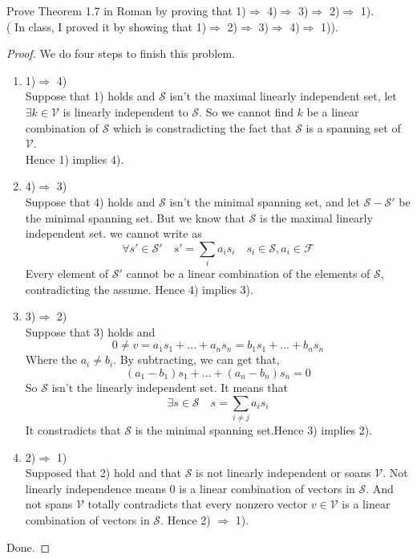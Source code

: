 \documentclass[a4paper]{article}
\begin{document}
\begin{description}
{    Prove Theorem 1.7 in Roman by proving that 1)$\Rightarrow$ 4)$\Rightarrow$  3)$\Rightarrow$  2)$\Rightarrow$  1).\\
    ( In class, I proved it by showing that 1)$\Rightarrow$  2)$\Rightarrow$  3)$\Rightarrow$  4)$\Rightarrow$  1)).
    }
    \begin{proof}
      We do four steps to finish this problem.
      \begin{enumerate}
        \item 1)$\Rightarrow $ 4)\\
        Suppose that 1) holds and $\mathcal{S}$ isn't the maximal linearly independent set,
        let $\exists k \in \mathcal{V}$ is linearly independent to $\mathcal{S}$.
        So we cannot find $k$ be a linear combination of $\mathcal{S}$ which is constradicting the fact that $\mathcal{S}$
        is a spanning set of $\mathcal{V}$.\\
        Hence 1) implies 4).
        \item 4)$\Rightarrow$ 3)\\
        Suppose that 4) holds and $\mathcal{S}$ isn't the minimal spanning set, and let $\mathcal{S}-\mathcal{S}'$ be
        the minimal spanning set. But we know that $\mathcal{S}$ is the maximal linearly independent set.
        we cannot write as $$\forall s' \in \mathcal{S}'\quad s'=\sum_{i} a_{i}s_{i} \quad s_{i} \in \mathcal{S},a_{i} \in \mathcal{F}$$
        Every element of $\mathcal{S}'$ cannot be a linear combination of the elements of $\mathcal{S}$,
        contradicting the assume. Hence 4) implies 3).
        \item 3)$\Rightarrow$ 2)\\
        Suppose that 3) holds and
        \begin{equation*}
          0\ne v=a_{1}s_{1}+...+a_{n}s_{n}=b_{1}s_{1}+...+b_{n}s_{n}
        \end{equation*}
        Where the $a_{i}\ne b_{i}$. By subtracting, we can get that,
        \begin{equation*}
          (a_{1}-b_{1})s_{1}+...+(a_{n}-b_{n})s_{n}=0
        \end{equation*}
        So $\mathcal{S}$ isn't the linearly independent set. It means that
        $$\exists s \in \mathcal{S} \quad s=\sum_{i\ne j} a_{i}s_{i}$$
        It constradicts that $\mathcal{S}$ is the minimal spanning set.Hence 3) implies 2).
        \item 2)$\Rightarrow$ 1)\\
        Supposed that 2) hold and that $\mathcal{S}$ is not linearly independent or soans $\mathcal{V}$.
        Not linearly independence means $0$ is a linear combination of vectors in $\mathcal{S}$.
        And not spans $\mathcal{V}$ totally contradicts that every nonzero vector $v\in \mathcal{V}$ is a linear combination of vectors in $\mathcal{S}$.
        Hence 2) $\Rightarrow$ 1).
      \end{enumerate}
      Done.
    \end{proof}
\end{description}
\end{document}
